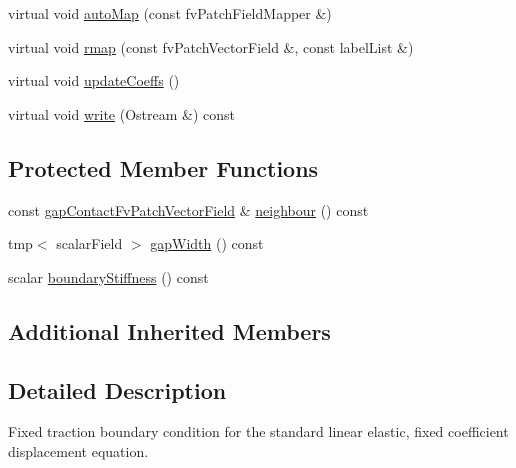 \begin{DoxyCompactItemize}
virtual void \hyperlink{classFoam_1_1gapContactFvPatchVectorField_a0ab0c43ce90d756c88dd81e3d0a9eef5}{auto\+Map} (const fv\+Patch\+Field\+Mapper \&)
\item 
virtual void \hyperlink{classFoam_1_1gapContactFvPatchVectorField_a4fe41b169c41bfcd4311c1d1e27a96ed}{rmap} (const fv\+Patch\+Vector\+Field \&, const label\+List \&)
\item 
virtual void \hyperlink{classFoam_1_1gapContactFvPatchVectorField_a7e24eafac629d3733181cd942d4c902f}{update\+Coeffs} ()
\item 
virtual void \hyperlink{classFoam_1_1gapContactFvPatchVectorField_a293fdfec8bdfbd5c3913ab4c9f3454ff}{write} (Ostream \&) const
\end{DoxyCompactItemize}
\subsection*{Protected Member Functions}
\begin{DoxyCompactItemize}
\item 
const \hyperlink{classFoam_1_1gapContactFvPatchVectorField}{gap\+Contact\+Fv\+Patch\+Vector\+Field} \& \hyperlink{classFoam_1_1gapContactFvPatchVectorField_ab2e303f32e766aefa59c6b2eb4eb9b0d}{neighbour} () const
\item 
tmp$<$ scalar\+Field $>$ \hyperlink{classFoam_1_1gapContactFvPatchVectorField_a66d6ceb4f8baa05f6925129e54af8130}{gap\+Width} () const
\item 
scalar \hyperlink{classFoam_1_1gapContactFvPatchVectorField_a200d97d8bb99741d5a1ce420403a3ee1}{boundary\+Stiffness} () const
\end{DoxyCompactItemize}
\subsection*{Additional Inherited Members}


\subsection{Detailed Description}
Fixed traction boundary condition for the standard linear elastic, fixed coefficient displacement equation. 

